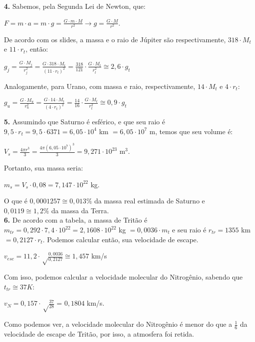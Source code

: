 \documentclass[12pt,letterpaper]{article}
\begin{document}
	    \textbf{4.} Sabemos, pela Segunda Lei de Newton, que:\\
	    \begin{center}
	    $ F = m\cdot a = m\cdot g = \frac{G\cdot m \cdot M}{r^2} \to g = \frac{G\cdot M}{r^2}$.\\
	    \end{center}
	    De acordo com os slides, a massa e o raio de Júpiter são respectivamente, $318 \cdot M_t$ e $11 \cdot r_t$, então: \\
	    \begin{center}
	    $g_j = \frac{G\cdot M_j}{r_j^2} = \frac{G\cdot 318 \cdot M_t}{(11 \cdot r_t)^2} = \frac{318}{121} \cdot \frac{G\cdot M_t}{r_t^2} \cong 2,6 \cdot g_t$
	    \end{center} 
	    Analogamente, para Urano, com massa e raio, respectivamente, $14 \cdot M_t$ e $4 \cdot r_t$:
	    \begin{center}
	    $g_u = \frac{G\cdot M_u}{r_u^2} = \frac{G\cdot 14 \cdot M_t}{(4 \cdot r_t)^2} = \frac{14}{16} \cdot \frac{G\cdot M_t}{r_t^2} \cong 0,9 \cdot g_t$
	    \end{center}
	    \textbf {5.} Assumindo que Saturno é esférico, e que seu raio é $9,5 \cdot r_t = 9,5 \cdot 6371 = 6,05 \cdot 10^4$ km $ = 6,05 \cdot 10^7$ m, temos que seu volume é:
	    \begin{center}
	    	$V_s = \frac{4 \pi r^3}{3} = \frac{4 \pi (6,05 \cdot 10^7)^3}{3} = 9,271 \cdot 10^{23}$ m$^3$.
	    \end{center}
	    Portanto, sua massa seria:
	    \begin{center}
	    	$m_s = V_s \cdot 0,08 = 7,147 \cdot 10^{22}$ kg.
	    \end{center}
	    O que é $0,0001257 \cong 0,013\%$ da massa real estimada de Saturno e $0,0119 \cong 1,2\%$ da massa da Terra. \\
	    
	    \textbf{6.} De acordo com a tabela, a massa de Tritão é
	    $m_{tr} = 0,292 \cdot 7,4 \cdot 10^{22} = 2,1608 \cdot 10^{22}$ kg $ = 0,0036 \cdot m_t$ e seu raio é $r_{tr} = 1355$ km $= 0,2127 \cdot r_t$.
	    Podemos calcular então, sua velocidade de escape.
	    \begin{center}
	    	 $v_{esc} = 11,2 \cdot \sqrt \frac{0,0036}{0,2127} \cong 1,457$ km/s
	    \end{center}
	    Com isso, podemos calcular a velocidade molecular do Nitrogênio, sabendo que $t_{tr} \cong 37 K$:
	    \begin{center}
		    $v_N = 0,157 \cdot \sqrt\frac{37}{28}$ = $0,1804$ km/s.
	    \end{center}
	    Como podemos ver, a velocidade molecular do Nitrogênio é menor do que a $\frac{1}{6}$ da velocidade de escape de Tritão, por isso, a atmosfera foi retida. 	    
			 
\end{document}
